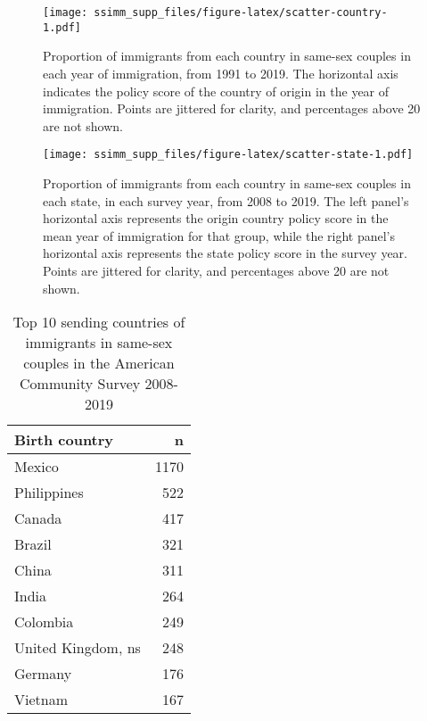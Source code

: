 \documentclass[
  11pt,
]{article}
\begin{document}
\begin{figure}
\centering
\texttt{[image: ssimm\_supp\_files/figure-latex/scatter-country-1.pdf]}
\caption{\label{fig:scatter-country}Proportion of immigrants from each country in same-sex couples in each year of immigration, from 1991 to 2019. The horizontal axis indicates the policy score of the country of origin in the year of immigration. Points are jittered for clarity, and percentages above 20 are not shown.}
\end{figure}

\begin{figure}
\centering
\texttt{[image: ssimm\_supp\_files/figure-latex/scatter-state-1.pdf]}
\caption{\label{fig:scatter-state}Proportion of immigrants from each country in same-sex couples in each state, in each survey year, from 2008 to 2019. The left panel's horizontal axis represents the origin country policy score in the mean year of immigration for that group, while the right panel's horizontal axis represents the state policy score in the survey year. Points are jittered for clarity, and percentages above 20 are not shown.}
\end{figure}

\begin{table}[!h]

\caption{\label{tab:desc-top1}Top 10 sending countries of immigrants in same-sex couples in the American Community Survey 2008-2019}
\centering
\begin{tabular}[t]{lr}
\toprule
Birth country & n\\
\midrule
Mexico & 1170\\
Philippines & 522\\
Canada & 417\\
Brazil & 321\\
China & 311\\
\addlinespace
India & 264\\
Colombia & 249\\
United Kingdom, ns & 248\\
Germany & 176\\
Vietnam & 167\\
\bottomrule
\end{tabular}
\end{table}
\end{document}

